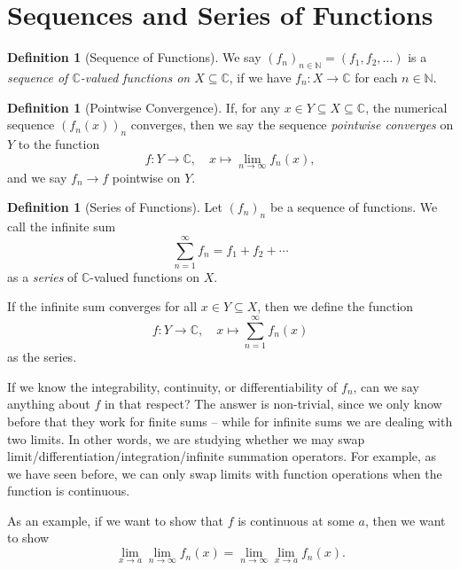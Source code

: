 \documentclass[11pt]{article}
\numberwithin{equation}{section}
\theoremstyle{definition}
\newtheorem{definition}[theorem]{Definition}
\theoremstyle{remark}
\newcommand{\pqty}[1]{\left(#1\right)}
\newcommand{\functiondomain}[3]{#1:#2\to #3}
\newcommand{\function}[5]{#1:#2\to #3,\quad #4\mapsto #5}
\newcommand{\CC}{\mathbb C}
\newcommand{\NN}{\mathbb N}
\begin{document}
\section{Sequences and Series of Functions}

\begin{definition}[Sequence of Functions]\label{analysis-unit-0198}
    \label{def:seq-of-fn}%
    We say \(\pqty{f_n}_{n \in \NN} = \pqty{f_1, f_2, \ldots}\) is a \emph{sequence of \(\CC\)-valued functions on \(X \subseteq \CC\)}, if we have \(\functiondomain{f_n}{X}{\CC}\) for each \(n \in \NN\).
\end{definition}

\begin{definition}[Pointwise Convergence]\label{analysis-unit-0199}
    \label{def:pointwise-convergence}%
    If, for any \(x \in Y \subseteq X \subseteq \CC\), the numerical sequence \(\pqty{f_n \pqty{x}}_{n}\) converges, then we say the sequence \emph{pointwise converges} on \(Y\) to the function
    \[
        \function{f}{Y}{\CC}{x}{\lim_{n \to \infty} f_n \pqty{x},}
    \]
    and we say \(f_n \to f\) pointwise on \(Y\).
\end{definition}

\begin{definition}[Series of Functions]\label{analysis-unit-0200}
    \label{def:series-of-functions}%
    Let \(\pqty{f_n}_{n}\) be a sequence of functions. We call the infinite sum
    \[
        \sum_{n = 1}^{\infty} f_n = f_1 + f_2 + \cdots
    \]
    as a \emph{series} of \(\CC\)-valued functions on \(X\).

    If the infinite sum converges for all \(x \in Y \subseteq X\), then we define the function
    \[
        \function{f}{Y}{\CC}{x}{\sum_{n = 1}^{\infty} f_n \pqty{x}}
    \]
    as the series.
\end{definition}

If we know the integrability, continuity, or differentiability of \(f_n\), can we say anything about \(f\) in that respect? The answer is non-trivial, since we only know before that they work for finite sums -- while for infinite sums we are dealing with two limits. In other words, we are studying whether we may swap limit/differentiation/integration/infinite summation operators. For example, as we have seen before, we can only swap limits with function operations when the function is continuous.

As an example, if we want to show that \(f\) is continuous at some \(a\), then we want to show
\[
    \lim_{x \to a} \lim_{n \to \infty} f_n \pqty{x} = \lim_{n \to \infty} \lim_{x \to a} f_n \pqty{x}.
\]
\end{document}
